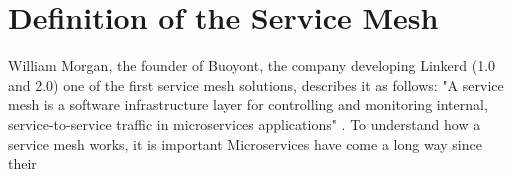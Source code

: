 \section{Definition of the Service Mesh}
William Morgan, the founder of Buoyont, the company developing Linkerd (1.0 and 2.0) one of the first service mesh solutions, describes it as follows: "A service mesh is a software infrastructure layer for controlling and monitoring internal, service-to-service traffic in microservices applications" \citep{william-history-service-mesh}.
To understand how a service mesh works, it is important
Microservices have come a long way since their 